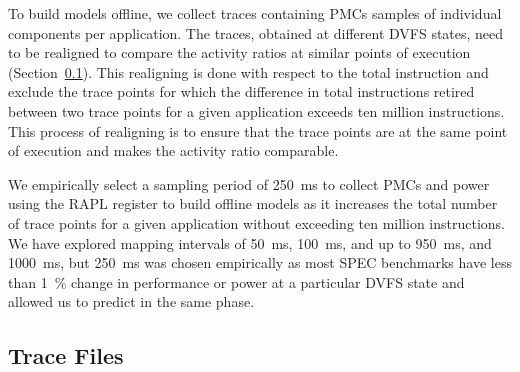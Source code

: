 

To build models offline, we collect traces containing PMCs samples of individual
components per application. The traces, obtained at different DVFS states, need to be
realigned to compare the activity ratios at similar points of execution
(Section~\ref{subsubsec: trace}). This realigning is done with respect to the total
instruction and exclude the trace points for which the difference in total instructions
retired between two trace points for a given application exceeds ten million instructions.
This process of realigning is to ensure that the trace points are at the same point of
execution and makes the activity ratio comparable.

 We empirically select a sampling period of \SI{250}{\milli\second} to
collect PMCs and power using the RAPL register to build offline models as it increases the
total number of trace points for a given application without exceeding ten million
instructions.  We have explored mapping intervals of \SI{50}{\milli\second},
\SI{100}{\milli\second}, and up to \SI{950}{\milli\second}, and \SI{1000}{\milli\second},
but \SI{250}{\milli\second} was chosen empirically as most SPEC benchmarks have less than
\SI{1}{\percent} change in performance or power at a particular DVFS state and allowed us
to predict in the same phase.

\subsection{Trace Files} 
\label{subsubsec: trace}

